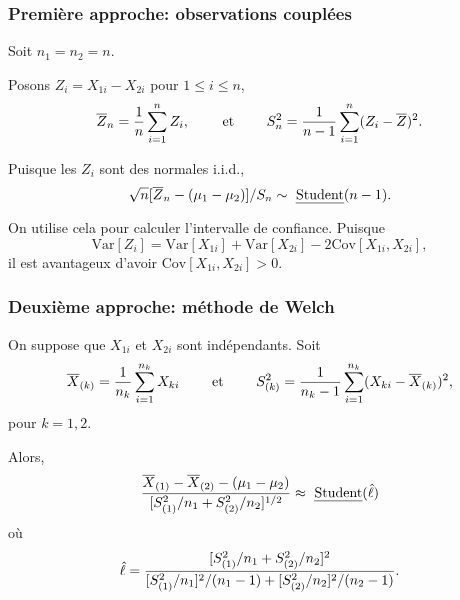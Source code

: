 \documentclass[t,usepdftitle=false]{beamer}
\def\Var{\mbox{Var}}
\def\Cov{\mbox{Cov}}
\def\iid{i.i.d.}
\begin{document}
\begin{frame}
\frametitle{Première approche: observations couplées}

Soit $n_1 = n_2 = {n}$.

\mbox{}

Posons ${Z_i} = X_{1i} - X_{2i}$ pour $1\le i\le n$,
$$
 \overline{Z}_n = {1\over n} \sum_{i=1}^n Z_i, \qquad\mbox{ et }\qquad
    S_n^2 = {1\over n-1} \sum_{i=1}^n (Z_i - \overline{Z})^2.
$$

\mbox{}

Puisque les $Z_i$ sont des normales \iid, 
\[
  \sqrt{n} [\overline{Z}_n - (\mu_1-\mu_2)]/S_n \sim \mbox{ \emph{Student}}(n-1).
\]

\mbox{}

On utilise cela pour calculer l'intervalle de confiance.
Puisque
\[
  \Var[Z_i] = \Var[X_{1i}] + \Var[X_{2i}] - 2 \Cov[X_{1i}, X_{2i}],
\]
il est avantageux d'avoir \emph{$\Cov[X_{1i}, X_{2i}] > 0$}.

\end{frame}

\begin{frame}
\frametitle{Deuxième approche: méthode de Welch}

On suppose que $X_{1i}$ et $X_{2i}$ sont indépendants.  Soit
$$
 {\overline{X}_{(k)}} = {1\over n_k} \sum_{i=1}^{n_k} X_{ki}
   \qquad\mbox{ et }\qquad
 {S_{(k)}^2} = {1\over n_k-1} \sum_{i=1}^{n_k} (X_{ki} -\overline{X}_{(k)})^2,
$$
pour $k=1,2$.

\mbox{}

Alors,
$$ {\overline{X}_{(1)} - \overline{X}_{(2)} - (\mu_1-\mu_2) \over
     [S_{(1)}^2/n_1 + S_{(2)}^2/n_2]^{1/2}}
     \approx \mbox{ \emph{Student}}(\hat\ell)
$$
où
$$
  {\hat\ell} = { [S_{(1)}^2/n_1 + S_{(2)}^2/n_2]^2 \over
                   [S_{(1)}^2/n_1]^2/(n_1-1) + [S_{(2)}^2/n_2]^2/(n_2-1)}.
$$
\end{frame}
\end{document}
